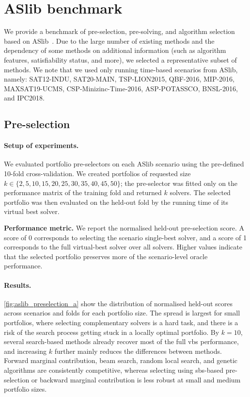 \section{ASlib benchmark}
\label{sec:aslib_appendix}

We provide a benchmark of pre-selection, pre-solving, and algorithm selection based on ASlib~\citep{BisEtAl16}. Due to the large number of existing methods and the dependency of some methods on additional information (such as algorithm features, satisfiability status, and more), we selected a representative subset of methods.
We note that we used only running time-based scenarios from ASlib, namely: SAT12-INDU, SAT20-MAIN, TSP-LION2015, QBF-2016, MIP-2016, MAXSAT19-UCMS, CSP-Minizinc-Time-2016, ASP-POTASSCO, BNSL-2016, and IPC2018.

\subsection{Pre-selection}

\paragraph{Setup of experiments.}
We evaluated portfolio pre-selectors on each ASlib scenario using the pre-defined 10-fold cross-validation. We created portfolios of requested size $k\in\{2,5,10,15,20,25,30,35,40,45,50\}$; the pre-selector was fitted only on the performance matrix of the training fold and returned $k$ solvers. The selected portfolio was then evaluated on the held-out fold by the running time of its virtual best solver. 

\textbf{Performance metric.} We report the normalised held-out pre-selection score. A score of 0 corresponds to selecting the scenario single-best solver, and a score of 1 corresponds to the full virtual-best solver over all solvers. Higher values indicate that the selected portfolio preserves more of the scenario-level oracle performance.

\paragraph{Results.}
\autoref{fig:aslib_preselection_a} show the distribution of normalised held-out scores across scenarios and folds for each portfolio size. The spread is largest for small portfolios, where selecting complementary solvers is a hard task, and there is a risk of the search process getting stuck in a locally optimal portfolio. By $k=10$, several search-based methods already recover most of the full \gls{vbs} performance, and increasing $k$ further mainly reduces the differences between methods. Forward marginal contribution, beam search, random local search, and genetic algorithms are consistently competitive, whereas selecting using \gls{sbs}-based pre-selection or backward marginal contribution is less robust at small and medium portfolio sizes.

